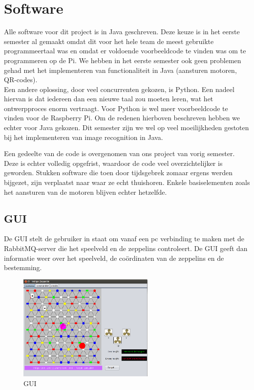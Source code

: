 \documentclass[eind]{penoverslag}
\begin{document}
\section{Software}

Alle software voor dit project is in Java geschreven. Deze keuze is in het eerste semester al gemaakt omdat dit voor het hele team de meest gebruikte programmeertaal was en omdat er voldoende voorbeeldcode te vinden was om te programmeren op de Pi. We hebben in het eerste semester ook geen problemen gehad met het implementeren van functionaliteit in Java (aansturen motoren, QR-codes). \\
Een andere oplossing, door veel concurrenten gekozen, is Python. Een nadeel hiervan is dat iedereen dan een nieuwe taal zou moeten leren, wat het ontwerpproces enorm vertraagt. Voor Python is wel meer voorbeeldcode te vinden voor de Raspberry Pi. Om de redenen hierboven beschreven hebben we echter voor Java gekozen. Dit semester zijn we wel op veel moeilijkheden gestoten bij het implementeren van image recognition in Java.

Een gedeelte van de code is overgenomen van ons project van vorig semester. Deze is echter volledig opgefrist, waardoor de code veel overzichtelijker is geworden. Stukken software die toen door tijdsgebrek zomaar ergens werden bijgezet, zijn verplaatst naar waar ze echt thuishoren. Enkele basiselementen zoals het aansturen van de motoren blijven echter hetzelfde.

\subsection{GUI}
De GUI stelt de gebruiker in staat om vanaf een pc verbinding te maken met de RabbitMQ-server die het speelveld en de zeppelins controleert. De GUI geeft dan informatie weer over het speelveld, de co\"{o}rdinaten van de zeppelins en de bestemming. \\

\begin{figure}[H]
\begin{center}
\includegraphics[width=0.6\textwidth]{GUI.png}
\end{center}
\caption{GUI}
\label{GUI}
\end{figure}
\end{document}
